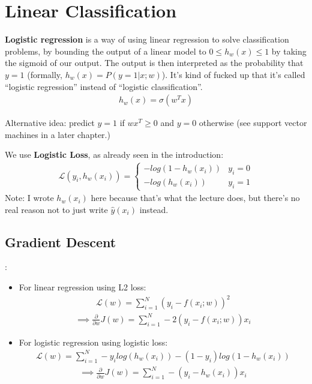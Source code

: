 \documentclass{report}
\newcommand{\tbf}{\textbf}
\newcommand{\pd}[1]{\frac{\partial}{\partial #1}}
\newcommand*{\newpar}{\par\vspace{\baselineskip}\noindent}
\newcommand{\loss}{\mathcal{L}}
\newcommand{\yhat}{\hat{y}}
\begin{document}
\section{Linear Classification}
\tbf{Logistic regression} is a way of using linear regression to solve classification problems, by bounding the output of a linear model to $0 \leq h_w(x) \leq 1$ by taking the sigmoid of our output. The output is then interpreted as the probability that $y = 1$ (formally, $h_w(x) = P(y = 1|x;w)$). It's kind of fucked up that it's called ``logistic regression'' instead of ``logistic classification''.
\begin{align}
 h_w(x) = \sigma(w^T x)
\end{align}

\newpar
Alternative idea: predict $y = 1$ if $w x^T \geq 0$ and $y = 0$ otherwise (see support vector machines in a later chapter.)
\newpar
We use \tbf{Logistic Loss}, as already seen in the introduction:
\begin{align}
 \loss(y_i,h_w(x_i)) =
 \begin{cases}
    -log(1-h_w(x_i)) & y_i = 0\\
    -log(h_w(x_i)) & y_i = 1
 \end{cases}
\end{align}
Note: I wrote $h_w(x_i)$ here because that's what the lecture does, but there's no real reason not to just write $\yhat(x_i)$ instead.
\subsection{Gradient Descent}:
\begin{itemize}
 \item For linear regression using L2 loss:
 \begin{align}
  \loss(w) = \sum_{i=1}^N (y_i - f(x_i; w))^2 
 \end{align}
 \begin{align}
  \implies \pd{w} J(w) = \sum_{i=1}^N -2(y_i - f(x_i;w))x_i
 \end{align}
 \item For logistic regression using logistic loss:
 \begin{align}
  \loss(w) = \sum_{i=1}^N -y_i log(h_w(x_i))-(1-y_i)log(1-h_w(x_i))
 \end{align}
 \begin{align}
  \implies \pd{w} J(w) = \sum_{i=1}^N -(y_i - h_w(x_i))x_i
 \end{align}
\end{itemize}
\end{document}

